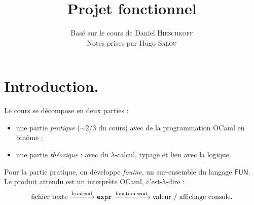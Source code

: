 \documentclass{../notes}
\title{Projet fonctionnel}
\author{Basé sur le cours de Daniel \textsc{Hirschkoff}\\ Notes prises par Hugo \textsc{Salou}}
\begin{document}
  \maketitle

  \dominitoc
  \tableofcontents

  \pagebreak

  \chapter*{Introduction.}

  Le cours se décompose en deux parties :
  \begin{itemize}
    \item une partie \textit{pratique} ($\sim 2/3$ du cours) avec de la programmation OCaml en binôme ;
    \item une partie \textit{théorique} : avec du $\lambda$-calcul, typage et lien avec la logique.
  \end{itemize}

  Pour la partie pratique, on développe \textit{fouine}, un sur-ensemble du langage $\mathsf{FUN}$.
  Le produit attendu est un interprète OCaml, c'est-à-dire :
  \[
    \text{fichier texte} \xrightarrow{\text{frontend}} \mathtt{expr} \xrightarrow{\text{fonction \texttt{eval}}} \text{valeur / affichage console}
  .\]
\end{document}
